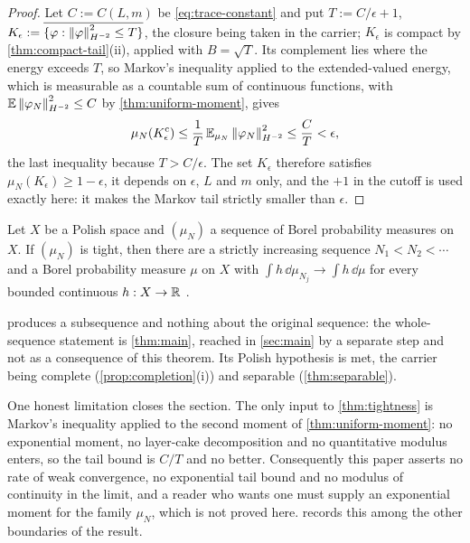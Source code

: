 \begin{proof}
Let $C:=C(L,m)$ be \eqref{eq:trace-constant} and put $T:=C/\epsilon+1$,
$K_\epsilon:=\overline{\{\varphi:\left\| \varphi \right\|^2_{H^{-2}}\le T\}}$, the
closure being taken in the carrier; $K_\epsilon$ is compact by
\cref{thm:compact-tail}(ii), applied with $B=\sqrt{T}$. Its complement lies
where the energy exceeds $T$, so Markov's inequality applied to the
extended-valued energy, which is measurable as a countable sum of continuous
functions, with $\mathbb{E}\left\| \varphi_N \right\|^2_{H^{-2}}\le C$ by
\cref{thm:uniform-moment}, gives
\[
  \mu_N(K_\epsilon^{\mathrm c})
  \le\frac{1}{T}\,\mathbb{E}_{\mu_N}\left\| \varphi_N \right\|^2_{H^{-2}}
  \le\frac{C}{T}<\epsilon ,
\]
the last inequality because $T>C/\epsilon$. The set $K_\epsilon$ therefore
satisfies $\mu_N(K_\epsilon)\ge1-\epsilon$, it depends on $\epsilon$, $L$
and $m$ only, and the $+1$ in the cutoff is used exactly here: it makes the
Markov tail strictly smaller than $\epsilon$.
\end{proof}

\begin{external}[Prokhorov]\label{ext:prokhorov}
Let $X$ be a Polish space and $(\mu_N)$ a sequence of Borel probability
measures on $X$. If $(\mu_N)$ is tight, then there are a strictly increasing
sequence $N_1<N_2<\cdots$ and a Borel probability measure $\mu$ on $X$ with
$\int h\,\dd\mu_{N_j}\to\int h\,\dd\mu$ for every bounded continuous
$h:X\to\mathbb{R}$ \cite{prokhorov1956}.
\end{external}

 produces a subsequence and nothing about the original
sequence: the whole-sequence statement is \cref{thm:main}, reached in
\cref{sec:main} by a separate step and not as a consequence of this
theorem. Its Polish hypothesis is met, the carrier being complete
(\cref{prop:completion}(i)) and separable (\cref{thm:separable}).

One honest limitation closes the section. The only input to
\cref{thm:tightness} is Markov's inequality applied to the second moment of
\cref{thm:uniform-moment}: no exponential moment, no layer-cake
decomposition and no quantitative modulus enters, so the tail bound is
$C/T$ and no better. Consequently this paper asserts no rate of weak
convergence, no exponential tail bound and no modulus of continuity in the
limit, and a reader who wants one must supply an exponential moment for the
family $\mu_N$, which is not proved here.  records this
among the other boundaries of the result.
